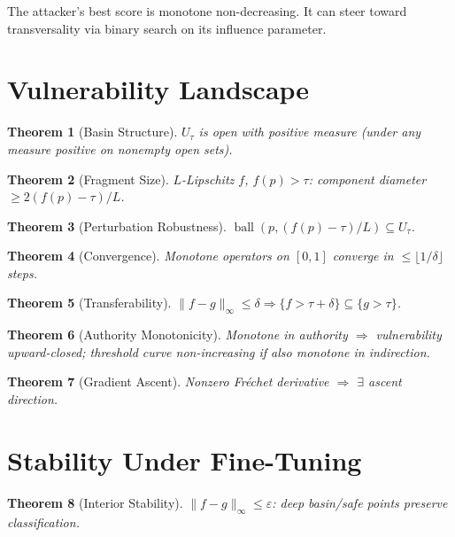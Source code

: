 \documentclass[11pt]{article}
\newtheorem{theorem}{Theorem}[section]
\begin{document}
The attacker's best score is monotone non-decreasing. It can steer toward transversality via binary search on its influence parameter.

\section{Vulnerability Landscape}
\label{sec:landscape-app}

\begin{theorem}[Basin Structure]
\label{thm:basin-app}
$U_\tau$ is open with positive measure (under any measure positive on nonempty open sets).
\end{theorem}

\begin{theorem}[Fragment Size]
$L$-Lipschitz $f$, $f(p) > \tau$: component diameter $\geq 2(f(p)-\tau)/L$.
\end{theorem}

\begin{theorem}[Perturbation Robustness]
$\operatorname{ball}(p, (f(p)-\tau)/L) \subseteq U_\tau$.
\end{theorem}

\begin{theorem}[Convergence]
Monotone operators on $[0,1]$ converge in $\leq \lfloor 1/\delta \rfloor$ steps.
\end{theorem}

\begin{theorem}[Transferability]
$\|f-g\|_\infty \leq \delta \Rightarrow \{f > \tau+\delta\} \subseteq \{g > \tau\}$.
\end{theorem}

\begin{theorem}[Authority Monotonicity]
Monotone in authority $\Rightarrow$ vulnerability upward-closed; threshold curve non-increasing if also monotone in indirection.
\end{theorem}

\begin{theorem}[Gradient Ascent]
Nonzero Fr\'{e}chet derivative $\Rightarrow$ $\exists$ ascent direction.
\end{theorem}

\section{Stability Under Fine-Tuning}
\label{sec:stability-app}

\begin{theorem}[Interior Stability]
\label{thm:interior-app}
$\|f-g\|_\infty \leq \varepsilon$: deep basin/safe points preserve classification.
\end{theorem}
\end{document}
